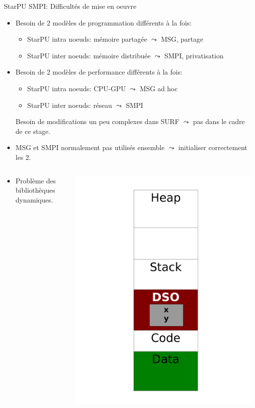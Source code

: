 \documentclass[11pt,xcolor=dvipsnames,presentation]{beamer}
\begin{document}
\begin{frame}[label=sec-2-4]{StarPU SMPI: Difficultés de mise en oeuvre}
\begin{itemize}
\item Besoin de 2 modèles de programmation différents à la fois:
\begin{itemize}
\item StarPU intra noeuds: mémoire partagée $\leadsto$ MSG, partage
\item StarPU inter noeuds: mémoire distribuée $\leadsto$ SMPI, privatisation
\end{itemize}

\item Besoin de 2 modèles de performance différents à la fois:
\begin{itemize}
\item StarPU intra noeuds: CPU-GPU $\leadsto$ MSG ad hoc
\item StarPU inter noeuds: réseau $\leadsto$ SMPI
\end{itemize}
Besoin de modifications un peu complexes dans SURF $\leadsto$ pas
dans le cadre de ce stage.
\item MSG et SMPI normalement pas utilisés ensemble $\leadsto$ initialiser
correctement les 2.
\end{itemize}
\vspace{-3.5mm}
  \begin{columns}[]
    \begin{column}{.55\linewidth}
\begin{itemize}
\item Problème des bibliothèques dynamiques.
\end{itemize}
  \end{column}
  \begin{column}{.35\linewidth}
 \includegraphics[width=.7\linewidth]{../Img/Dyn.pdf}
  \end{column}
\end{columns}
\end{frame}
\end{document}
